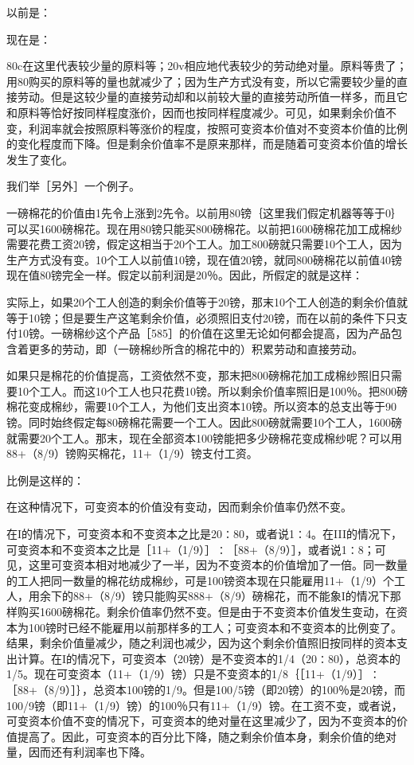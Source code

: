 以前是：

\todo{}

现在是：

\todo{}

80c在这里代表较少量的原料等；20v相应地代表较少的劳动绝对量。原料等贵了；用80购买的原料等的量也就减少了；因为生产方式没有变，所以它需要较少量的直接劳动。但是这较少量的直接劳动却和以前较大量的直接劳动所值一样多，而且它和原料等恰好按同样程度涨价，因而也按同样程度减少。可见，如果剩余价值不变，利润率就会按照原料等涨价的程度，按照可变资本价值对不变资本价值的比例的变化程度而下降。但是剩余价值率不是原来那样，而是随着可变资本价值的增长发生了变化。

我们举［另外］一个例子。

一磅棉花的价值由1先令上涨到2先令。以前用80镑｛这里我们假定机器等等于0｝可以买1600磅棉花。现在用80镑只能买800磅棉花。以前把1600磅棉花加工成棉纱需要花费工资20镑，假定这相当于20个工人。加工800磅就只需要10个工人，因为生产方式没有变。10个工人以前值10镑，现在值20镑，就同800磅棉花以前值40镑现在值80镑完全一样。假定以前利润是20％。因此，所假定的就是这样：

实际上，如果20个工人创造的剩余价值等于20镑，那末10个工人创造的剩余价值就等于10镑；但是要生产这笔剩余价值，必须照旧支付20镑，而在以前的条件下只支付10镑。一磅棉纱这个产品［585］的价值在这里无论如何都会提高，因为产品包含着更多的劳动，即（一磅棉纱所含的棉花中的）积累劳动和直接劳动。

如果只是棉花的价值提高，工资依然不变，那末把800磅棉花加工成棉纱照旧只需要10个工人。而这10个工人也只花费10镑。所以剩余价值率照旧是100％。把800磅棉花变成棉纱，需要10个工人，为他们支出资本10镑。所以资本的总支出等于90镑。同时始终假定每80磅棉花需要一个工人。因此800磅就需要10个工人，1600磅就需要20个工人。那末，现在全部资本100镑能把多少磅棉花变成棉纱呢？可以用88+（8/9）镑购买棉花，11+（1/9）镑支付工资。

比例是这样的：

在这种情况下，可变资本的价值没有变动，因而剩余价值率仍然不变。

在I的情况下，可变资本和不变资本之比是20∶80，或者说1∶4。在III的情况下，可变资本和不变资本之比是［11+（1/9）］∶［88+（8/9）］，或者说1∶8；可见，这里可变资本相对地减少了一半，因为不变资本的价值增加了一倍。同一数量的工人把同一数量的棉花纺成棉纱，可是100镑资本现在只能雇用11+（1/9）个工人，用余下的88+（8/9）镑只能购买888+（8/9）磅棉花，而不能象I的情况下那样购买1600磅棉花。剩余价值率仍然不变。但是由于不变资本价值发生变动，在资本为100镑时已经不能雇用以前那样多的工人；可变资本和不变资本的比例变了。结果，剩余价值量减少，随之利润也减少，因为这个剩余价值照旧按同样的资本支出计算。在I的情况下，可变资本（20镑）是不变资本的1/4（20∶80），总资本的1/5。现在可变资本（11+（1/9）镑）只是不变资本的1/8｛［11+（1/9）］∶［88+（8/9）］｝，总资本100镑的1/9。但是100/5镑（即20镑）的100％是20镑，而100/9镑（即11+（1/9）镑）的100％只有11+（1/9）镑。在工资不变，或者说，可变资本价值不变的情况下，可变资本的绝对量在这里减少了，因为不变资本的价值提高了。因此，可变资本的百分比下降，随之剩余价值本身，剩余价值的绝对量，因而还有利润率也下降。

